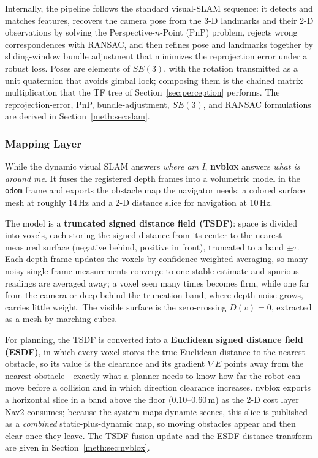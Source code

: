 Internally, the pipeline follows the standard visual-SLAM sequence: it detects and matches features, recovers the camera pose from the 3-D landmarks and their 2-D observations by solving the Perspective-$n$-Point (PnP) problem, rejects wrong correspondences with RANSAC, and then refines pose and landmarks together by sliding-window bundle adjustment that minimizes the reprojection error under a robust loss. Poses are elements of $SE(3)$, with the rotation transmitted as a unit quaternion that avoids gimbal lock; composing them is the chained matrix multiplication that the TF tree of Section~\ref{sec:perception} performs. The reprojection-error, PnP, bundle-adjustment, $SE(3)$, and RANSAC formulations are derived in Section~\ref{meth:sec:slam}.

\subsubsection{Mapping Layer}\label{sec:mapping}

While the dynamic visual SLAM answers \emph{where am I}, \textbf{nvblox} answers \emph{what is around me}. It fuses the registered depth frames into a volumetric model in the \texttt{odom} frame and exports the obstacle map the navigator needs: a colored surface mesh at roughly 14\,Hz and a 2-D distance slice for navigation at 10\,Hz.

The model is a \textbf{truncated signed distance field (TSDF)}: space is divided into voxels, each storing the signed distance from its center to the nearest measured surface (negative behind, positive in front), truncated to a band $\pm\tau$. Each depth frame updates the voxels by confidence-weighted averaging, so many noisy single-frame measurements converge to one stable estimate and spurious readings are averaged away; a voxel seen many times becomes firm, while one far from the camera or deep behind the truncation band, where depth noise grows, carries little weight. The visible surface is the zero-crossing $D(v)=0$, extracted as a mesh by marching cubes.

For planning, the TSDF is converted into a \textbf{Euclidean signed distance field (ESDF)}, in which every voxel stores the true Euclidean distance to the nearest obstacle, so its value is the clearance and its gradient $\nabla E$ points away from the nearest obstacle---exactly what a planner needs to know how far the robot can move before a collision and in which direction clearance increases. nvblox exports a horizontal slice in a band above the floor ($0.10$--$0.60$\,m) as the 2-D cost layer Nav2 consumes; because the system maps dynamic scenes, this slice is published as a \emph{combined} static-plus-dynamic map, so moving obstacles appear and then clear once they leave. The TSDF fusion update and the ESDF distance transform are given in Section~\ref{meth:sec:nvblox}.

